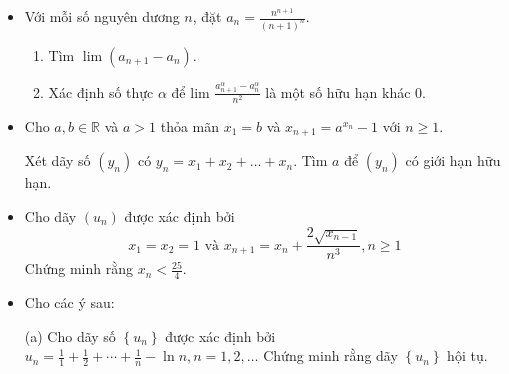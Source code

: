 \documentclass[11pt]{scrartcl}
\begin{document}
\begin{itemize}[label=, leftmargin=0em, itemsep=0.5em]
\begin{btvn}
    \end{btvn}
    \item\begin{btvn}
        Với mỗi số nguyên dương $n$, đặt $a_n=\frac{n^{n+1}}{(n+1)^n}$.
        \begin{enumerate}[label=(\alph*)]
            \item Tìm $\lim \left(a_{n+1}-a_n\right)$.
            \item Xác định số thực $\alpha$ để lim $\frac{a_{n+1}^\alpha-a_n^\alpha}{n^2}$ là một số hữu hạn khác 0.
        \end{enumerate}
    \end{btvn}
    \item \begin{btvn}
        Cho $a,b \in \mathbb{R}$ và $a > 1$ thỏa mãn $x_1 = b$ và $x_{n + 1}= a^{x_n} - 1$ với $n \geq 1$.
        
        Xét dãy số $(y_n)$ có $y_n = x_1 + x_2 +\dots+ x_n$. Tìm $a$ để $(y_n)$ có giới hạn hữu hạn.
    \end{btvn}
    \item \begin{btvn}
        Cho dãy $(u_n)$ được xác định bởi
        \[
            x_1 = x_2 = 1 \text{ và }x_{n + 1} = x_n + \frac{2\sqrt{x_{n - 1}}}{n^3}, n \geq 1
        \]
        Chứng minh rằng $x_n < \frac{25}{4}$.
    \end{btvn}
    \item \begin{btvn} Cho các ý sau:
    

        (a) Cho dãy số $\left\{u_n\right\}$ được xác định bởi $u_n=\frac{1}{1}+\frac{1}{2}+\cdots+\frac{1}{n}-\ln n, n=1,2, \ldots$ Chứng minh rằng dãy $\left\{u_n\right\}$ hội tụ.



\end{btvn}
\end{itemize}
\end{document}
